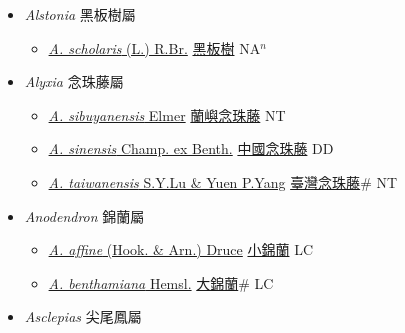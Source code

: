 
  \begin{itemize}
 \item[] \textit{Alstonia} 黑板樹屬
                    
  \begin{itemize}
        \item[] \href{http://www.theplantlist.org/tpl1.1/search?q=Alstonia+scholaris}{\textit{A. scholaris} (L.) R.Br.}   \href{\detokenize{http://taibnet.sinica.edu.tw/chi/taibnet_species_list.php?T2=黑板樹&T2_new_value=true&fr=y}}{黑板樹} NA$^n$
  \end{itemize}
 \item[] \textit{Alyxia} 念珠藤屬
                    
  \begin{itemize}
        \item[] \href{http://www.theplantlist.org/tpl1.1/search?q=Alyxia+sibuyanensis}{\textit{A. sibuyanensis} Elmer}   \href{\detokenize{http://taibnet.sinica.edu.tw/chi/taibnet_species_list.php?T2=蘭嶼念珠藤&T2_new_value=true&fr=y}}{蘭嶼念珠藤} NT
        \item[] \href{http://www.theplantlist.org/tpl1.1/search?q=Alyxia+sinensis}{\textit{A. sinensis} Champ. ex Benth.}   \href{\detokenize{http://taibnet.sinica.edu.tw/chi/taibnet_species_list.php?T2=中國念珠藤&T2_new_value=true&fr=y}}{中國念珠藤} DD
        \item[] \href{http://www.theplantlist.org/tpl1.1/search?q=Alyxia+taiwanensis}{\textit{A. taiwanensis} S.Y.Lu \& Yuen P.Yang}   \href{\detokenize{http://taibnet.sinica.edu.tw/chi/taibnet_species_list.php?T2=臺灣念珠藤&T2_new_value=true&fr=y}}{臺灣念珠藤}\# NT
  \end{itemize}
 \item[] \textit{Anodendron} 錦蘭屬
                    
  \begin{itemize}
        \item[] \href{http://www.theplantlist.org/tpl1.1/search?q=Anodendron+affine}{\textit{A. affine} (Hook. \& Arn.) Druce}   \href{\detokenize{http://taibnet.sinica.edu.tw/chi/taibnet_species_list.php?T2=小錦蘭&T2_new_value=true&fr=y}}{小錦蘭} LC
        \item[] \href{http://www.theplantlist.org/tpl1.1/search?q=Anodendron+benthamiana}{\textit{A. benthamiana} Hemsl.}   \href{\detokenize{http://taibnet.sinica.edu.tw/chi/taibnet_species_list.php?T2=大錦蘭&T2_new_value=true&fr=y}}{大錦蘭}\# LC
  \end{itemize}
 \item[] \textit{Asclepias} 尖尾鳳屬
                    

\end{itemize}
